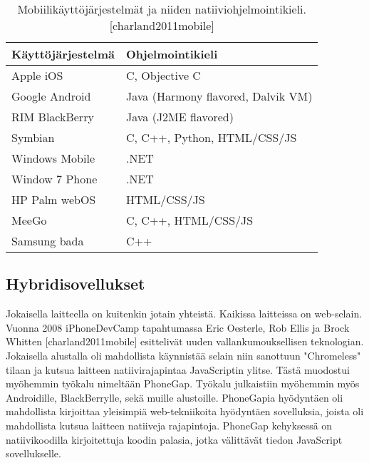 \documentclass{tktltiki}
\begin{document}
\clearpage

\begin{table}[!ht]
\centering
\begin{small}
\caption{Mobiilikäyttöjärjestelmät ja niiden natiiviohjelmointikieli. [charland2011mobile] }
\begin{tabular}{|L{7cm}|L{7cm}|}
\hline
\textbf{Käyttöjärjestelmä} & 
\textbf{Ohjelmointikieli}
\\ \hline
Apple iOS & 
 C, Objective C
\\ \hline
Google Android & 
Java (Harmony flavored, Dalvik VM) \\ 
\hline
RIM BlackBerry & 
Java (J2ME flavored) \\ 
\hline
Symbian & 
C, C++, Python, HTML/CSS/JS \\ 
\hline
Windows Mobile & 
.NET \\ 
\hline
Window 7 Phone & 
.NET \\ 
\hline
HP Palm webOS & 
HTML/CSS/JS \\ 
\hline
MeeGo & 
C, C++, HTML/CSS/JS \\ 
\hline
Samsung bada & 
C++ \\ 
\hline
\end{tabular}
\label{table:ExampleTable2}
\end{small}
\end{table}


\subsection{Hybridisovellukset}

Jokaisella laitteella on kuitenkin jotain yhteistä. Kaikissa laitteissa on web-selain. Vuonna 2008 iPhoneDevCamp tapahtumassa Eric Oesterle, Rob Ellis ja Brock Whitten [charland2011mobile] esittelivät uuden vallankumouksellisen teknologian. Jokaisella alustalla oli mahdollista käynnistää selain niin sanottuun "Chromeless" tilaan ja kutsua laitteen natiivirajapintaa JavaScriptin ylitse. Tästä muodostui myöhemmin työkalu nimeltään PhoneGap. Työkalu julkaistiin myöhemmin myös Androidille, BlackBerrylle, sekä muille alustoille. PhoneGapia hyödyntäen oli mahdollista kirjoittaa yleisimpiä web-tekniikoita hyödyntäen sovelluksia, joista oli mahdollista kutsua laitteen natiiveja rajapintoja. PhoneGap kehyksessä on natiivikoodilla kirjoitettuja koodin palasia, jotka välittävät tiedon JavaScript sovellukselle.
\end{document}
